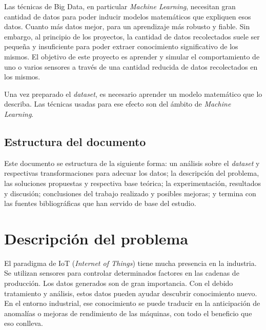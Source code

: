 \documentclass[11pt,spanish,listoffigures,listoftables]{tfgetsinf}
\begin{document}
Las técnicas de Big Data, en particular {\em Machine Learning}, necesitan gran cantidad de datos para poder inducir modelos matemáticos que expliquen esos datos. Cuanto más datos mejor, para un aprendizaje más robusto y fiable. Sin embargo, al principio de los proyectos, la cantidad de datos recolectados suele ser pequeña y insuficiente para poder extraer conocimiento significativo de los mismos. El objetivo de este proyecto es aprender y simular el comportamiento de uno o varios sensores a través de una cantidad reducida de datos recolectados en los mismos. 

Una vez preparado el {\em dataset}, es necesario aprender un modelo matemático que lo describa. Las técnicas usadas para ese efecto son del ámbito de {\em Machine Learning}. 

    
    \section{Estructura del documento}
    
    Este documento se estructura de la siguiente forma: un análisis sobre el {\em dataset} y respectivas transformaciones para adecuar los datos; la descripción del problema, las soluciones propuestas y respectiva base teórica; la experimentación, resultados y discusión; conclusiones del trabajo realizado y posibles mejoras; y termina con las fuentes bibliográficas que han servido de base del estudio.

\chapter{Descripción del problema}
El paradigma de IoT ({\em Internet of Things}) tiene mucha presencia en la industria. Se utilizan sensores para controlar determinados factores en las cadenas de producción. Los datos generados son de gran importancia. Con el debido tratamiento y análisis, estos datos pueden ayudar descubrir conocimiento nuevo. En el entorno industrial, ese conocimiento se puede traducir en la anticipación de anomalías o mejoras de rendimiento de las máquinas, con todo el beneficio que eso conlleva.
\end{document}
